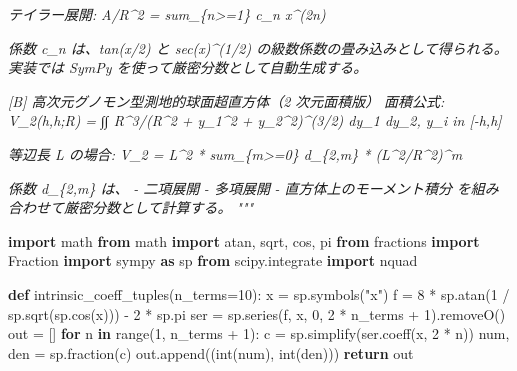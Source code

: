 \documentclass[
  12pt,
  a4paper,
]{article}
\newenvironment{Shaded}{}{}
\newcommand{\BuiltInTok}[1]{\textcolor[rgb]{0.00,0.50,0.00}{#1}}
\newcommand{\CommentTok}[1]{\textcolor[rgb]{0.38,0.63,0.69}{\textit{#1}}}
\newcommand{\ControlFlowTok}[1]{\textcolor[rgb]{0.00,0.44,0.13}{\textbf{#1}}}
\newcommand{\DecValTok}[1]{\textcolor[rgb]{0.25,0.63,0.44}{#1}}
\newcommand{\ImportTok}[1]{\textcolor[rgb]{0.00,0.50,0.00}{\textbf{#1}}}
\newcommand{\KeywordTok}[1]{\textcolor[rgb]{0.00,0.44,0.13}{\textbf{#1}}}
\newcommand{\NormalTok}[1]{#1}
\newcommand{\OperatorTok}[1]{\textcolor[rgb]{0.40,0.40,0.40}{#1}}
\newcommand{\StringTok}[1]{\textcolor[rgb]{0.25,0.44,0.63}{#1}}
\begin{document}
\begin{Shaded}
\begin{Highlighting}[]
\CommentTok{    テイラー展開:}
\CommentTok{        A/R\^{}2 = sum\_\{n\textgreater{}=1\} c\_n x\^{}(2n)}

\CommentTok{    係数 c\_n は、tan(x/2) と sec(x)\^{}(1/2) の級数係数の畳み込みとして得られる。}
\CommentTok{    実装では SymPy を使って厳密分数として自動生成する。}

\CommentTok{[B] 高次元グノモン型測地的球面超直方体（2 次元面積版）}
\CommentTok{    面積公式:}
\CommentTok{        V\_2(h,h;R)}
\CommentTok{          = ∫∫ R\^{}3/(R\^{}2 + y\_1\^{}2 + y\_2\^{}2)\^{}(3/2) dy\_1 dy\_2,  y\_i in [{-}h,h]}

\CommentTok{    等辺長 L の場合:}
\CommentTok{        V\_2 = L\^{}2 * sum\_\{m\textgreater{}=0\} d\_\{2,m\} * (L\^{}2/R\^{}2)\^{}m}

\CommentTok{    係数 d\_\{2,m\} は、}
\CommentTok{    {-} 二項展開}
\CommentTok{    {-} 多項展開}
\CommentTok{    {-} 直方体上のモーメント積分}
\CommentTok{    を組み合わせて厳密分数として計算する。}
\CommentTok{"""}

\ImportTok{import}\NormalTok{ math}
\ImportTok{from}\NormalTok{ math }\ImportTok{import}\NormalTok{ atan, sqrt, cos, pi}
\ImportTok{from}\NormalTok{ fractions }\ImportTok{import}\NormalTok{ Fraction}
\ImportTok{import}\NormalTok{ sympy }\ImportTok{as}\NormalTok{ sp}
\ImportTok{from}\NormalTok{ scipy.integrate }\ImportTok{import}\NormalTok{ nquad}


\KeywordTok{def}\NormalTok{ intrinsic\_coeff\_tuples(n\_terms}\OperatorTok{=}\DecValTok{10}\NormalTok{):}
\NormalTok{    x }\OperatorTok{=}\NormalTok{ sp.symbols(}\StringTok{"x"}\NormalTok{)}
\NormalTok{    f }\OperatorTok{=} \DecValTok{8} \OperatorTok{*}\NormalTok{ sp.atan(}\DecValTok{1} \OperatorTok{/}\NormalTok{ sp.sqrt(sp.cos(x))) }\OperatorTok{{-}} \DecValTok{2} \OperatorTok{*}\NormalTok{ sp.pi}
\NormalTok{    ser }\OperatorTok{=}\NormalTok{ sp.series(f, x, }\DecValTok{0}\NormalTok{, }\DecValTok{2} \OperatorTok{*}\NormalTok{ n\_terms }\OperatorTok{+} \DecValTok{1}\NormalTok{).removeO()}
\NormalTok{    out }\OperatorTok{=}\NormalTok{ []}
    \ControlFlowTok{for}\NormalTok{ n }\KeywordTok{in} \BuiltInTok{range}\NormalTok{(}\DecValTok{1}\NormalTok{, n\_terms }\OperatorTok{+} \DecValTok{1}\NormalTok{):}
\NormalTok{        c }\OperatorTok{=}\NormalTok{ sp.simplify(ser.coeff(x, }\DecValTok{2} \OperatorTok{*}\NormalTok{ n))}
\NormalTok{        num, den }\OperatorTok{=}\NormalTok{ sp.fraction(c)}
\NormalTok{        out.append((}\BuiltInTok{int}\NormalTok{(num), }\BuiltInTok{int}\NormalTok{(den)))}
    \ControlFlowTok{return}\NormalTok{ out}



\end{Highlighting}
\end{Shaded}
\end{document}
